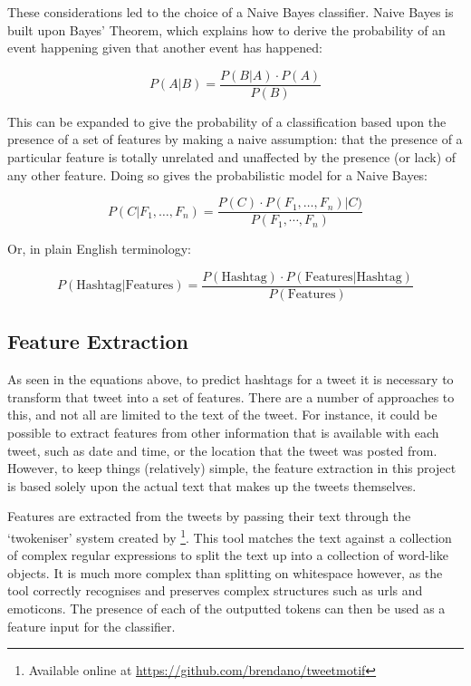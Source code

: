 \documentclass[11pt,a4paper]{report}
\begin{document}
These considerations led to the choice of a Naive Bayes classifier. Naive Bayes is built upon Bayes' Theorem, which explains how to derive the probability of an event happening given that another event has happened:

\begin{equation}
    P(A|B) = \frac{P(B|A) \cdot P(A)}{P(B)}
\end{equation}

This can be expanded to give the probability of a classification based upon the presence of a set of features by making a naive assumption: that the presence of a particular feature is totally unrelated and unaffected by the presence (or lack) of any other feature. Doing so gives the probabilistic model for a Naive Bayes:

\begin{equation}
    P(C|F_1,\dots,F_n) = \frac{P(C) \cdot P(F_1,\dots,F_n)|C)}{P(F_1,\cdots,F_n)}
\end{equation}

Or, in plain English terminology:

\begin{equation}
    P(\text{Hashtag}|\text{Features}) = \frac{P(\text{Hashtag}) \cdot P(\text{Features}|\text{Hashtag})}{P(\text{Features})}
\end{equation}

\subsection{Feature Extraction}
As seen in the equations above, to predict hashtags for a tweet it is necessary to transform that tweet into a set of features. There are a number of approaches to this, and not all are limited to the text of the tweet. For instance, it could be possible to extract features from other information that is available with each tweet, such as date and time, or the location that the tweet was posted from. However, to keep things (relatively) simple, the feature extraction in this project is based solely upon the actual text that makes up the tweets themselves.

Features are extracted from the tweets by passing their text through the `twokeniser' system created by \textcite{OConnor:2010}\footnote{Available online at \url{https://github.com/brendano/tweetmotif}}. This tool matches the text against a collection of complex regular expressions to split the text up into a collection of word-like objects. It is much more complex than splitting on whitespace however, as the tool correctly recognises and preserves complex structures such as urls and emoticons. The presence of each of the outputted tokens can then be used as a feature input for the classifier.
\end{document}
